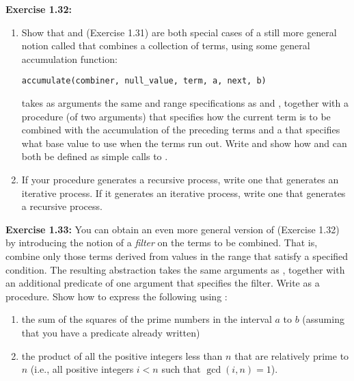 \textbf{Exercise 1.32:}
\begin{enumerate}
\item Show that  and  (Exercise 1.31) are both special cases of a still more general notion called  that combines a collection of terms, using some general accumulation function:

\begin{lstlisting}[style=slate]
accumulate(combiner, null_value, term, a, next, b)
\end{lstlisting}

 takes as arguments the same  and range specifications as  and , together with a  procedure (of two arguments) that specifies how the current term is to be combined with the accumulation of the preceding terms and a  that specifies what base value to use when the terms run out. Write  and show how  and  can both be defined as simple calls to .

\item If your  procedure generates a recursive process, write one that generates an iterative process. If it generates an iterative process, write one that generates a recursive process.
\end{enumerate}

\textbf{Exercise 1.33:} You can obtain an even more general version of  (Exercise 1.32) by introducing the notion of a \emph{filter} on the terms to be combined. That is, combine only those terms derived from values in the range that satisfy a specified condition. The resulting  abstraction takes the same arguments as , together with an additional predicate of one argument that specifies the filter. Write  as a procedure. Show how to express the following using :

\begin{enumerate}
\item the sum of the squares of the prime numbers in the interval $a$ to $b$ (assuming that you have a  predicate already written)

\item the product of all the positive integers less than $n$ that are relatively prime to $n$ (i.e., all positive integers $i < n$ such that $\gcd(i,n) = 1$).
\end{enumerate}

